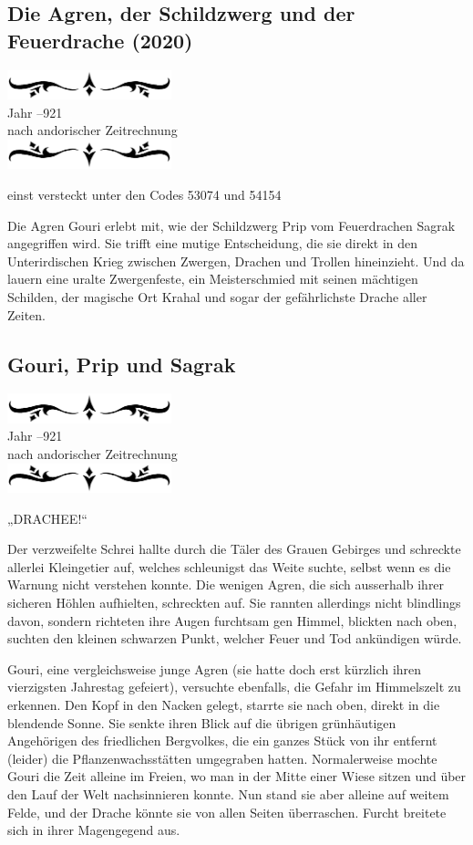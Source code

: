 \documentclass[10pt, a4paper, oneside]{book}
\newcommand{\az}[1]{%
    \begin{center}
        \includegraphics[width=180px]{Das Erbe des Wunderkindes/verzierung1.png}\\
        {\Huge #1} \\
        {nach andorischer Zeitrechnung}\\
        \includegraphics[width=180px]{Das Erbe des Wunderkindes/verzierung2.png}
    \end{center}
    \extramarks{}{#1 a.Z.}
}
\begin{document}
\begin{chapterbox}
    \chapter{Die Agren, der Schildzwerg und der Feuerdrache (2020)}
    \label{Die Agren, der Schildzwerg und der Feuerdrache (2020)}
    \az{Jahr –921}

    \begin{center}
        einst versteckt unter den Codes 53074 und 54154
    \end{center}
    
    Die Agren Gouri erlebt mit, wie der Schildzwerg Prip vom Feuerdrachen Sagrak angegriffen wird. Sie trifft eine mutige Entscheidung, die sie direkt in den Unterirdischen Krieg zwischen Zwergen, Drachen und Trollen hineinzieht. Und da lauern eine uralte Zwergenfeste, ein Meisterschmied mit seinen mächtigen Schilden, der magische Ort Krahal und sogar der gefährlichste Drache aller Zeiten.
\end{chapterbox}

\section{Gouri, Prip und Sagrak}

\az{Jahr –921}

„DRACHEE!“

Der verzweifelte Schrei hallte durch die Täler des Grauen Gebirges und schreckte allerlei Kleingetier auf, welches schleunigst das Weite suchte, selbst wenn es die Warnung nicht verstehen konnte. Die wenigen Agren, die sich ausserhalb ihrer sicheren Höhlen aufhielten, schreckten auf. Sie rannten allerdings nicht blindlings davon, sondern richteten ihre Augen furchtsam gen Himmel, blickten nach oben, suchten den kleinen schwarzen Punkt, welcher Feuer und Tod ankündigen würde.

Gouri, eine vergleichsweise junge Agren (sie hatte doch erst kürzlich ihren vierzigsten Jahrestag gefeiert), versuchte ebenfalls, die Gefahr im Himmelszelt zu erkennen. Den Kopf in den Nacken gelegt, starrte sie nach oben, direkt in die blendende Sonne. Sie senkte ihren Blick auf die übrigen grünhäutigen Angehörigen des friedlichen Bergvolkes, die ein ganzes Stück von ihr entfernt (leider) die Pflanzenwachsstätten umgegraben hatten. Normalerweise mochte Gouri die Zeit alleine im Freien, wo man in der Mitte einer Wiese sitzen und über den Lauf der Welt nachsinnieren konnte. Nun stand sie aber alleine auf weitem Felde, und der Drache könnte sie von allen Seiten überraschen. Furcht breitete sich in ihrer Magengegend aus.
\end{document}
